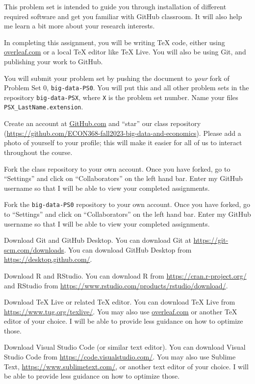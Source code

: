\documentclass[12pt,english]{exam}
\begin{document}
This problem set is intended to guide you through installation of different required software and get you familiar with GitHub classroom. It will also help me learn a bit more about your research interests. 

In completing this assignment, you will be writing TeX code, either using \url{overleaf.com} or a local TeX editor like TeX Live. You will also be using Git, and publishing your work to GitHub.

You will submit your problem set by pushing the document to \emph{your} fork of Problem Set 0, \texttt{big-data-PS0}. You will put this and all other problem sets in the repository \texttt{big-data-PSX}, where \texttt{X} is the problem set number. Name your files \texttt{PSX\_LastName.extension}.

\begin{questions}
\question Create an account at \url{GitHub.com} and ``star'' our class repository (\url{https://github.com/ECON368-fall2023-big-data-and-economics}). Please add a photo of yourself to your profile; this will make it easier for all of us to interact throughout the course.

\question Fork the class repository to your own account. Once you have forked, go to ``Settings'' and click on ``Collaborators'' on the left hand bar. Enter my GitHub username so that I will be able to view your completed assignments.

\question Fork the \texttt{big-data-PS0} repository to your own account. Once you have forked, go to ``Settings'' and click on ``Collaborators'' on the left hand bar. Enter my GitHub username so that I will be able to view your completed assignments.

\question Download Git and GitHub Desktop. You can download Git at \url{https://git-scm.com/downloads}. You can download GitHub Desktop from \url{https://desktop.github.com/}. 

\question Download R and RStudio. You can download R from \url{https://cran.r-project.org/} and RStudio from \url{https://www.rstudio.com/products/rstudio/download/}. 

\question Download TeX Live or related TeX editor. You can download TeX Live from \url{https://www.tug.org/texlive/}. You may also use \url{overleaf.com} or another TeX editor of your choice. I will be able to provide less guidance on how to optimize those.

\question Download Visual Studio Code (or similar text editor). You can download Visual Studio Code from \url{https://code.visualstudio.com/}. You may also use Sublime Text, \url{https://www.sublimetext.com/}, or another text editor of your choice. I will be able to provide less guidance on how to optimize those. 


\end{questions}
\end{document}
